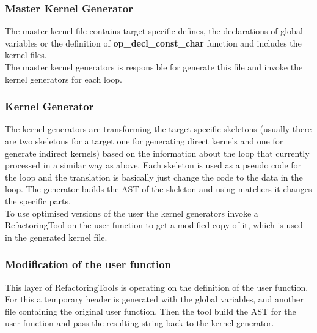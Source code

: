 \subsubsection{Master Kernel Generator}
The master kernel file contains target specific defines, the declarations of global variables or the definition of \textbf{op\_decl\_const\_char} function and includes the kernel files.\\ The master kernel generators is responsible for generate this file and invoke the kernel generators for each loop.

\subsubsection{Kernel Generator}
The kernel generators are transforming the target specific skeletons (usually there are two skeletons for a target one for generating direct kernels and one for generate indirect kernels) based on the information about the loop that currently processed in a similar way as above. Each skeleton is used as a pseudo code for the loop and the translation is basically just change the code to the data in the loop. The generator builds the AST of the skeleton and using matchers it changes the specific parts.\\
To use optimised versions of the user the kernel generators invoke a RefactoringTool on the user function to get a modified copy of it, which is used in the generated kernel file.

\subsubsection{Modification of the user function}
This layer of RefactoringTools is operating on the definition of the user function. For this a temporary header is generated with the global variables, and another file containing the original user function. Then the tool build the AST for the user function and pass the resulting string back to the kernel generator.

